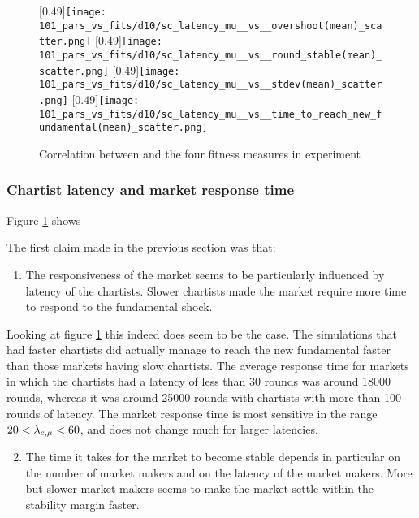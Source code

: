 \begin{figure}
	\centering
	[0.49\linewidth]{\texttt{[image: 101\_pars\_vs\_fits/d10/sc\_latency\_mu\_\_vs\_\_overshoot(mean)\_scatter.png]}}
	[0.49\linewidth]{\texttt{[image: 101\_pars\_vs\_fits/d10/sc\_latency\_mu\_\_vs\_\_round\_stable(mean)\_scatter.png]}}
	[0.49\linewidth]{\texttt{[image: 101\_pars\_vs\_fits/d10/sc\_latency\_mu\_\_vs\_\_stdev(mean)\_scatter.png]}}
	[0.49\linewidth]{\texttt{[image: 101\_pars\_vs\_fits/d10/sc\_latency\_mu\_\_vs\_\_time\_to\_reach\_new\_fundamental(mean)\_scatter.png]}}
	\caption{Correlation between \sclatencymu and the four fitness measures in experiment \dten}
	\label{fig:d10_parvfit_sclatencymu}
\end{figure}

\subsubsection{Chartist latency and market response time}
Figure \ref{fig:d10_parvfit_sclatencymu} shows 

The first claim made in the previous section was that:
\begin{enumerate}
\setcounter{enumi}{0}
\item The responsiveness of the market seems to be particularly influenced by latency of the chartists. Slower chartists made the market require more time to respond to the fundamental shock.
\end{enumerate}
Looking at figure \ref{fig:d10_parvfit_sclatencymu} this indeed does seem to be the case. The simulations that had faster chartists did actually manage to reach the new fundamental faster than those markets having slow chartists. The average response time for markets in which the chartists had a latency of less than 30 rounds was around 18000 rounds, whereas it was around 25000 rounds with chartists with more than 100 rounds of latency. The market response time is most sensitive in the range $20< \lambda_{c, \mu}<60$, and does not change much for larger latencies. 

\begin{enumerate}
\setcounter{enumi}{1}
\item The time it takes for the market to become stable depends in particular on the number of market makers and on the latency of the market makers. More but slower market makers seems to make the market settle within the stability margin faster.
\end{enumerate}

